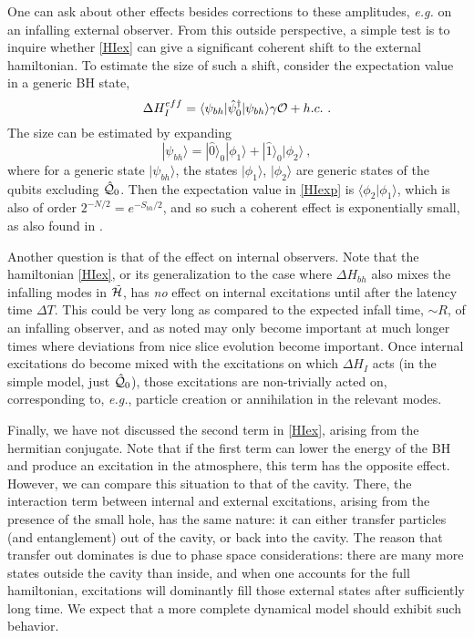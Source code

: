\documentclass[12pt]{article}
\numberwithin{equation}{section}
\newcommand{\calo}{{\cal O}}
\newcommand{\calh}{{\cal H}}
\newcommand{\calq}{{\cal Q}}
\newcommand{\beq}{\begin{equation}}
\newcommand{\eeq}{\end{equation}}
\begin{document}
One can ask about other effects besides corrections to these amplitudes, {\it e.g.} on an infalling external observer.  From this outside perspective, a simple test is to inquire whether  \eqref{HIex} can give a significant coherent shift to the external hamiltonian.  To estimate the size of such a shift, consider the expectation value in a generic BH state,
\beq\label{HIexp}
\Delta H_I^{eff} = \langle \psi_{bh}|\hat \psi_0^\dagger| \psi_{bh}\rangle \gamma \calo + h.c.\ .
\eeq
The size can be estimated by expanding 
\beq
|\psi_{bh}\rangle = |\hat0\rangle_0 |\phi_1\rangle +  |\hat1\rangle_0  |\phi_2\rangle\ ,
\eeq
where for a generic state $|\psi_{bh}\rangle$, the states $ |\phi_1\rangle$, $ |\phi_2\rangle$ are generic states of the qubits excluding $\hat \calq_0$. Then the expectation value in \eqref{HIexp} is $\langle \phi_2|\phi_1\rangle$, which is also of order $2^{-N/2} = e^{-S_{bh}/2}$, and so such a coherent effect is exponentially small, as also found in \cite{NVU}.

Another question is that of the effect on internal observers.  Note that the hamiltonian \eqref{HIex}, or its generalization to the case where  $\Delta H_{bh}$ also mixes  the infalling modes in $\tilde \calh$, has {\it no} effect on internal excitations until after the latency time $\Delta T$.  This could be very long as compared to the expected infall time, $\sim R$, of an infalling observer, and as noted may only become important at much longer times where deviations from nice slice evolution become important.  Once internal excitations do become mixed with the excitations on which $\Delta H_I$ acts (in the simple model, just $\hat \calq_0$), those excitations are non-trivially acted on, corresponding to, {\it e.g.}, particle creation or annihilation in the relevant modes.

Finally, we have not discussed the second term in \eqref{HIex}, arising from the hermitian conjugate.  Note that if the first term can lower the energy of the BH and produce an excitation in the atmosphere, this term has the opposite effect.  However, we can compare this situation to that of the cavity.  There, the interaction term between internal and external excitations, arising from the presence of the small hole, has the same nature: it can either transfer particles (and entanglement) out of the cavity, or back into the cavity.  The reason that transfer out dominates is due to phase space considerations:  there are many more states outside the cavity than inside, and when one accounts for the full hamiltonian, excitations will dominantly fill those external states after sufficiently long time.  We expect that a more complete dynamical model should exhibit such behavior.
\end{document}
